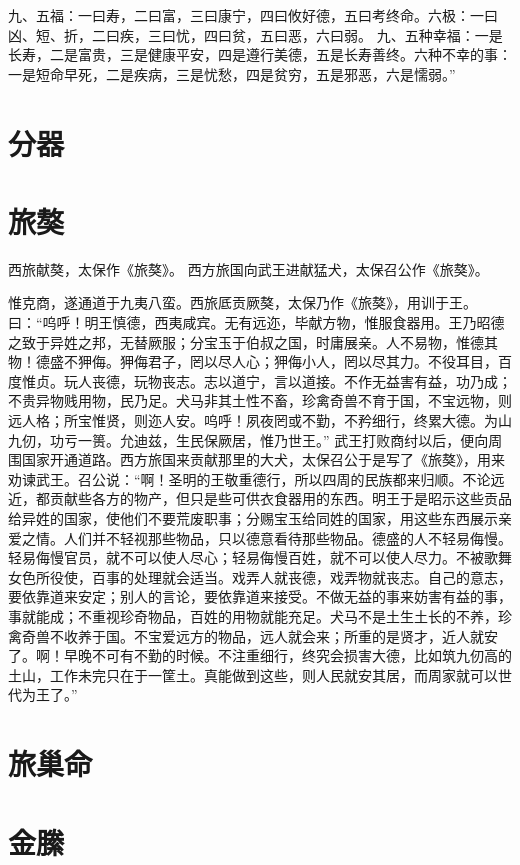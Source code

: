 \documentclass[12pt,UTF8]{ctexbook}
\begin{document}
九、五福：一曰寿，二曰富，三曰康宁，四曰攸好德，五曰考终命。六极：一曰凶、短、折，二曰疾，三曰忧，四曰贫，五曰恶，六曰弱。
九、五种幸福：一是长寿，二是富贵，三是健康平安，四是遵行美德，五是长寿善终。六种不幸的事：一是短命早死，二是疾病，三是忧愁，四是贫穷，五是邪恶，六是懦弱。”

\chapter{分器}

\chapter{旅獒}

西旅献獒，太保作《旅獒》。
西方旅国向武王进献猛犬，太保召公作《旅獒》。

惟克商，遂通道于九夷八蛮。西旅厎贡厥獒，太保乃作《旅獒》，用训于王。曰：“呜呼！明王慎德，西夷咸宾。无有远迩，毕献方物，惟服食器用。王乃昭德之致于异姓之邦，无替厥服；分宝玉于伯叔之国，时庸展亲。人不易物，惟德其物！德盛不狎侮。狎侮君子，罔以尽人心；狎侮小人，罔以尽其力。不役耳目，百度惟贞。玩人丧德，玩物丧志。志以道宁，言以道接。不作无益害有益，功乃成；不贵异物贱用物，民乃足。犬马非其土性不畜，珍禽奇兽不育于国，不宝远物，则远人格；所宝惟贤，则迩人安。呜呼！夙夜罔或不勤，不矜细行，终累大德。为山九仞，功亏一篑。允迪兹，生民保厥居，惟乃世王。”
武王打败商纣以后，便向周围国家开通道路。西方旅国来贡献那里的大犬，太保召公于是写了《旅獒》，用来劝谏武王。召公说：“啊！圣明的王敬重德行，所以四周的民族都来归顺。不论远近，都贡献些各方的物产，但只是些可供衣食器用的东西。明王于是昭示这些贡品给异姓的国家，使他们不要荒废职事；分赐宝玉给同姓的国家，用这些东西展示亲爱之情。人们并不轻视那些物品，只以德意看待那些物品。德盛的人不轻易侮慢。轻易侮慢官员，就不可以使人尽心；轻易侮慢百姓，就不可以使人尽力。不被歌舞女色所役使，百事的处理就会适当。戏弄人就丧德，戏弄物就丧志。自己的意志，要依靠道来安定；别人的言论，要依靠道来接受。不做无益的事来妨害有益的事，事就能成；不重视珍奇物品，百姓的用物就能充足。犬马不是土生土长的不养，珍禽奇兽不收养于国。不宝爱远方的物品，远人就会来；所重的是贤才，近人就安了。啊！早晚不可有不勤的时候。不注重细行，终究会损害大德，比如筑九仞高的土山，工作未完只在于一筐土。真能做到这些，则人民就安其居，而周家就可以世代为王了。”

\chapter{旅巢命}

\chapter{金縢}
\end{document}
